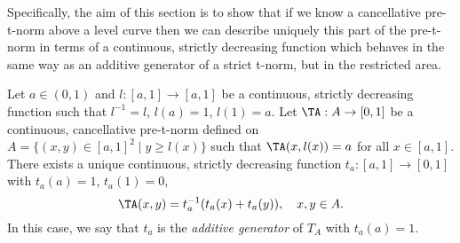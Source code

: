 Specifically, the aim of this section is to show that if we know a cancellative pre-t-norm above a level curve then we can describe uniquely this part of the pre-t-norm in terms of a continuous, strictly decreasing function which behaves in the same way as an additive generator of a strict t-norm, but in the restricted area.

\begin{theorem}\label{thm:generatorabovelevelcurve}
	Let $a \in (0,1)$ and $l:[a,1] \to [a,1]$ be a continuous, strictly decreasing function such that $l^{-1}=l$, $l(a)=1$, $l(1)=a$. Let $\TA: A \to [0,1]$ be a continuous, cancellative pre-t-norm defined on $A=\{(x,y) \in [a,1]^2 \mid y \geq l(x)\}$ such that $\TA(x,l(x))=a $ for all $x \in [a,1]$. There exists a unique continuous, strictly decreasing function $t_a:[a,1] \to [0,1]$ with $t_a(a)=1$, $t_a(1)=0$,
	$$\TA(x,y)=t_a^{-1} (t_a(x)+t_a(y)), \quad x,y \in A.$$
	In this case, we say that $t_a$ is the \emph{additive generator} of $T_A$ with $t_a(a)=1$.
\end{theorem}

